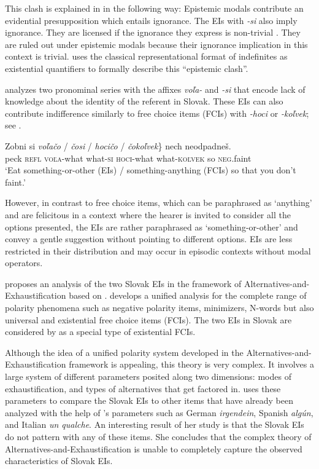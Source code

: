 \documentclass[output=paper,colorlinks,citecolor=brown]{langscibook}
\begin{document}
\noindent This clash is explained in \citet{Simik2015} in the following way: Epistemic modals contribute an evidential presupposition which entails ignorance. The EIs with \textit{-si} also imply ignorance. They are licensed if the ignorance they express is non-trivial \citep{Aloni.Port2013}. They are ruled out under epistemic modals because their ignorance implication in this context is trivial. \citet{Simik2015} uses the classical representational format of indefinites as existential quantifiers to formally describe this “epistemic clash”.

\citet{Richtarcikova2015} analyzes two pronominal series with the affixes \textit{voľa-} and \textit{-si} that encode lack of knowledge about the identity of the referent in Slovak. These EIs can also contribute indifference similarly to free choice items (FCIs) with \textit{-hoci} or \textit{-koľvek}; see .

\ea\label{geist:ex:richtarcikova1}
\gll Zobni si \minsp{\{} \textit{voľačo} / \textit{čosi} / \textit{hocičo} / \textit{čokoľvek}\} nech neodpadneš.\\
peck \textsc{refl} {} \textsc{voľa}-what {} what-\textsc{si} {} \textsc{hoci}-what {} what-\textsc{koľvek} so \textsc{neg}.faint\\
\glt ‘Eat something-or-other (EIs) / something-anything (FCIs) so that you don’t faint.’\hfill\citep[399]{Richtarcikova2015}
\z

\noindent However, in contrast to free choice items, which can be paraphrased as ‘anything’ and are felicitous in a context where the hearer is invited to consider all the options presented, the EIs are rather paraphrased as ‘something-or-other’ and convey a gentle suggestion without pointing to different options. EIs are less restricted in their distribution and may occur in episodic contexts without modal operators.

\citeauthor{Richtarcikova2015} proposes an analysis of the two Slovak EIs in the framework of Alternatives-and-Exhaustification based on \citet{Chierchia2013}. \citeauthor{Chierchia2013} develops a unified analysis for the complete range of polarity phenomena such as negative polarity items, minimizers, N-words but also universal and existential free choice items (FCIs). The two EIs in Slovak are considered by \citeauthor{Richtarcikova2015} as a special type of existential FCIs.

Although the idea of a unified polarity system developed in the Alternatives-and-Exhaustification framework is appealing, this theory is very complex. It involves a large system of different parameters posited along two dimensions: modes of exhaustification, and types of alternatives that get factored in. \citeauthor{Richtarcikova2015} uses these parameters to compare the Slovak EIs to other items that have already been analyzed with the help of \citeauthor{Chierchia2013}’s parameters such as German \textit{irgendein}, Spanish \textit{algún}, and Italian \textit{un qualche}. An interesting result of her study is that the Slovak EIs do not pattern with any of these items. She concludes that the complex theory of Alternatives-and-Exhaustification is unable to completely capture the observed characteristics of Slovak EIs.
\end{document}
